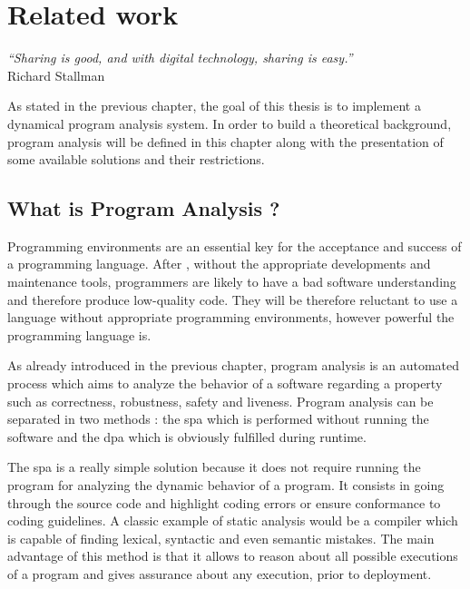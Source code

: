 
\chapter{Related work}
\label{chap:relatedwork}
\begin{flushright}
\textit{``Sharing is good, and with digital technology, sharing is easy.''} \\ Richard Stallman
\end{flushright}

As stated in the previous chapter, the goal of this thesis is to implement a dynamical program analysis system. In order to build a theoretical background, program analysis will be defined in this chapter along with the presentation of some available solutions and their restrictions.

\section{What is Program Analysis ?} 
Programming environments are an essential key for the acceptance and success of a programming language. After \cite{Ducasse1994}, without the appropriate developments and maintenance tools, programmers are likely to have a bad software understanding and therefore produce low-quality code. They will be therefore reluctant to use a language without appropriate programming environments, however powerful the programming language is.

As already introduced in the previous chapter, program analysis is an automated process which aims to analyze the behavior of a software regarding a property such as correctness, robustness, safety and liveness. Program analysis can be separated in two methods : the \gls{spa} which is performed without running the software and the \gls{dpa} which is obviously fulfilled during runtime. \citep{Wikipedi2016}

The \gls{spa} is a really simple solution because it does not require running the program for analyzing the dynamic behavior of a program. It consists in going through the source code and highlight coding errors or ensure conformance to coding guidelines. A classic example of static analysis would be a compiler which is capable of finding lexical, syntactic and even semantic mistakes. The main advantage of this method is that it allows to reason about all possible executions of a program and gives assurance about any execution, prior to deployment. 

